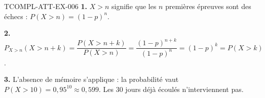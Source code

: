 \begin{corrige}{TCOMPL-ATT-EX-006}
\textbf{1.} $X>n$ signifie que les $n$ premières épreuves sont des échecs :
$P(X>n)=(1-p)^n$.

\textbf{2.} $P_{X>n}(X>n+k)=\dfrac{P(X>n+k)}{P(X>n)}
=\dfrac{(1-p)^{n+k}}{(1-p)^n}=(1-p)^k=P(X>k)$.

\textbf{3.} L'absence de mémoire s'applique : la probabilité vaut
$P(X>10)=0{,}95^{10}\approx0{,}599$. Les $30$ jours déjà écoulés
n'interviennent pas.
\end{corrige}
